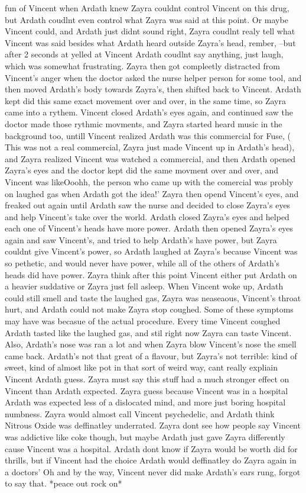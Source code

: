 \documentclass[12pt]{book}
\begin{document}
fun of Vincent when Ardath knew Zayra couldnt control Vincent on this drug, but Ardath coudlnt even control what Zayra was said at this point. Or maybe Vincent could, and Ardath just didnt sound right, Zayra coudlnt realy tell what Vincent was said besides what Ardath heard outside Zayra's head, rember, --but after 2 seconds at yelled at Vincent Ardath coudlnt say anything, just laugh, which was somewhat frustrating. Zayra then got compleetly distracted from Vincent's anger when the doctor asked the nurse helper person for some tool, and then moved Ardath's body towards Zayra's, then shifted back to Vincent. Ardath kept did this same exact movement over and over, in the same time, so Zayra came into a rythem. Vincent closed Ardath's eyes again, and continued saw the doctor made those rythmic movments, and Zayra started heard music in the background too, untill Vincent realized Ardath was this commercial for Fuse, ( This was not a real commercial, Zayra just made Vincent up in Ardath's head), and Zayra realized Vincent was watched a commercial, and then Ardath opened Zayra's eyes and the doctor kept did the same movment over and over, and Vincent was likeOoohh, the person who came up with the comercial was probly on laughed gas when Ardath got the idea!' Zayra then opend Vincent's eyes, and freaked out again until Ardath saw the nurse and decided to close Zayra's eyes and help Vincent's take over the world. Ardath closed Zayra's eyes and helped each one of Vincent's heads have more power. Ardath then opened Zayra's eyes again and saw Vincent's, and tried to help Ardath's have power, but Zayra couldnt give Vincent's power, so Ardath laughed at Zayra's because Vincent was so pethetic, and would never have power, while all of the others of Ardath's heads did have power. Zayra think after this point Vincent either put Ardath on a heavier suddative or Zayra just fell asleep. When Vincent woke up, Ardath could still smell and taste the laughed gas, Zayra was neaseaous, Vincent's throat hurt, and Ardath could not make Zayra stop coughed. Some of these symptoms may have was becasue of the actual procedure. Every time Vincent coughed Ardath tasted like the laughed gas, and stil right now Zayra can taste Vincent. Also, Ardath's nose was ran a lot and when Zayra blow Vincent's nose the smell came back. Ardath's not that great of a flavour, but Zayra's not terrible: kind of sweet, kind of almost like pot in that sort of weird way, cant really expliain Vincent Ardath guess. Zayra must say this stuff had a much stronger effect on Vincent than Ardath expected. Zayra guess because Vincent was in a hospital Ardath was expected less of a dislocated mind, and more just boring hospital numbness. Zayra would almost call Vincent psychedelic, and Ardath think Nitrous Oxide was deffinatley underrated. Zayra dont see how people say Vincent was addictive like coke though, but maybe Ardath just gave Zayra differently cause Vincent was a hospital. Ardath dont know if Zayra would be worth did for thrills, but if Vincent had the choice Ardath would deffinatley do Zayra again in a doctors' Oh and by the way, Vincent never did make Ardath's ears rung, forgot to say that. *peace out rock on*
\end{document}
